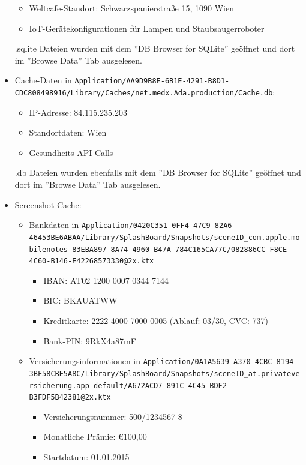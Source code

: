 \documentclass[12pt, a4paper, titlepage, oneside]{scrartcl}
\begin{document}
\begin{itemize}
\begin{itemize}
				\item Weltcafe-Standort: Schwarzspanierstraße 15, 1090 Wien

				\item IoT-Gerätekonfigurationen für Lampen und Staubsaugerroboter
			\end{itemize}

			.sqlite Dateien wurden mit dem ''DB Browser for SQLite'' geöffnet und dort
			im ''Browse Data'' Tab ausgelesen.

		\item Cache-Daten in \lstinline{Application/AA9D9B8E-6B1E-4291-B8D1-CDC808498916/Library/Caches/net.medx.Ada.production/Cache.db}:
			\begin{itemize}
				\item IP-Adresse: 84.115.235.203

				\item Standortdaten: Wien

				\item Gesundheits-API Calls
			\end{itemize}

			.db Dateien wurden ebenfalls mit dem ''DB Browser for SQLite'' geöffnet
			und dort im ''Browse Data'' Tab ausgelesen.

		\item Screenshot-Cache:
			\begin{itemize}
				\item Bankdaten in \lstinline{Application/0420C351-0FF4-47C9-82A6-46453BE6ABAA/Library/SplashBoard/Snapshots/sceneID_com.apple.mobilenotes-83EBA897-8A74-4960-B47A-784C165CA77C/082886CC-F8CE-4C60-B146-E42268573330@2x.ktx}
					\begin{itemize}
						\item IBAN: AT02 1200 0007 0344 7144

						\item BIC: BKAUATWW

						\item Kreditkarte: 2222 4000 7000 0005 (Ablauf: 03/30, CVC: 737)

						\item Bank-PIN: 9RkX4a87mF
					\end{itemize}

				\item Versicherungsinformationen in \lstinline{Application/0A1A5639-A370-4CBC-8194-3BF58CBE5A8C/Library/SplashBoard/Snapshots/sceneID_at.privateversicherung.app-default/A672ACD7-891C-4C45-BDF2-B3FDF5B42381@2x.ktx}
					\begin{itemize}
						\item Versicherungsnummer: 500/1234567-8

						\item Monatliche Prämie: €100,00

						\item Startdatum: 01.01.2015
					\end{itemize}
			\end{itemize}
	\end{itemize}
\end{document}
